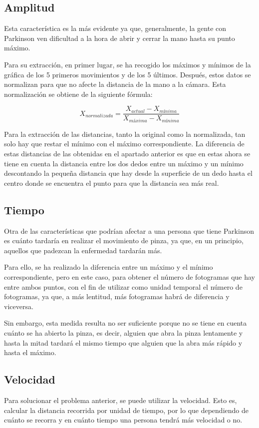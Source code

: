 \subsection{Amplitud}
Esta característica es la más evidente ya que, generalmente, la gente con Parkinson ven dificultad a la hora de abrir y cerrar la mano hasta su punto máximo.

Para su extracción, en primer lugar, se ha recogido los máximos y mínimos de la gráfica de los 5 primeros movimientos y de los 5 últimos. Después, estos datos se normalizan para que no afecte la distancia de la mano a la cámara. Esta normalización se obtiene de la siguiente fórmula:

\begin{equation}
	X_{normalizada} = \frac{X_{actual} - X_{mínima}}{X_{máxima}-X_{mínima}}
\end{equation}

Para la extracción de las distancias, tanto la original como la normalizada, tan solo hay que restar el mínimo con el máximo correspondiente. La diferencia de estas distancias de las obtenidas en el apartado anterior es que en estas ahora se tiene en cuenta la distancia entre los dos dedos entre un máximo y un mínimo descontando la pequeña distancia que hay desde la superficie de un dedo hasta el centro donde se encuentra el punto para que la distancia sea más real.

\subsection{Tiempo}
Otra de las características que podrían afectar a una persona que tiene Parkinson es cuánto tardaría en realizar el movimiento de pinza, ya que, en un principio, aquellos que padezcan la enfermedad tardarán más.

Para ello, se ha realizado la diferencia entre un máximo y el mínimo correspondiente, pero en este caso, para obtener el número de fotogramas que hay entre ambos puntos, con el fin de utilizar como unidad temporal el número de fotogramas, ya que, a más lentitud, más fotogramas habrá de diferencia y viceversa.

Sin embargo, esta medida resulta no ser suficiente porque no se tiene en cuenta cuánto se ha abierto la pinza, es decir, alguien que abra la pinza lentamente y hasta la mitad tardará el mismo tiempo que alguien que la abra más rápido y hasta el máximo.

\subsection{Velocidad}
Para solucionar el problema anterior, se puede utilizar la velocidad. Esto es, calcular la distancia recorrida por unidad de tiempo, por lo que dependiendo de cuánto se recorra y en cuánto tiempo una persona tendrá más velocidad o no.

